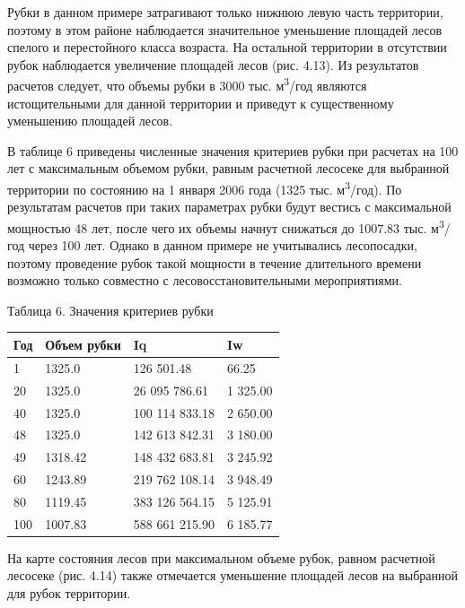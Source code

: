 \documentclass{article}
\begin{document}
Рубки в данном примере затрагивают только нижнюю 
левую часть территории, поэтому в этом районе 
наблюдается значительное уменьшение площадей 
лесов спелого и перестойного класса возраста. 
На остальной территории в отсутствии рубок 
наблюдается увеличение площадей лесов (рис. 
4.13). Из результатов расчетов следует, что объемы 
рубки в 3000 тыс. м\textsuperscript{3}/год являются истощительными 
для данной территории и приведут к существенному 
уменьшению площадей лесов.

В таблице 6 приведены численные значения критериев 
рубки при расчетах на 100 лет с максимальным 
объемом рубки, равным расчетной лесосеке для 
выбранной территории по состоянию на 1 января 
2006 года (1325 тыс. м\textsuperscript{3}/год). По результатам 
расчетов при таких параметрах рубки будут вестись 
с максимальной мощностью 48 лет, после чего их 
объемы начнут снижаться до 1007.83 тыс. м\textsuperscript{3}/год 
через 100 лет. Однако в данном примере не учитывались 
лесопосадки, поэтому проведение рубок такой 
мощности в течение длительного времени возможно 
только совместно с лесовосстановительными 
мероприятиями.

\begin{flushright}
Таблица 6. Значения критериев рубки

\begin{tabular}{|>{\raggedright}p{39pt}|>{\raggedright}p{98pt}|>{\raggedright}p{133pt}|>{\raggedright}p{133pt}|}
\hline
Год & Объем рубки & Iq & Iw\tabularnewline
\hline
1 & 1325.0 & 126 501.48 & 66.25\tabularnewline
\hline
20 & 1325.0 & 26 095 786.61 & 1 325.00\tabularnewline
\hline
40 & 1325.0 & 100 114 833.18 & 2 650.00\tabularnewline
\hline
48 & 1325.0 & 142 613 842.31 & 3 180.00\tabularnewline
\hline
49 & 1318.42 & 148 432 683.81 & 3 245.92\tabularnewline
\hline
60 & 1243.89 & 219 762 108.14 & 3 948.49\tabularnewline
\hline
80 & 1119.45 & 383 126 564.15 & 5 125.91\tabularnewline
\hline
100 & 1007.83 & 588 661 215.90 & 6 185.77\tabularnewline
\hline
\end{tabular}
\end{flushright}

На карте состояния лесов при максимальном объеме 
рубок, равном расчетной лесосеке (рис. 4.14) также 
отмечается уменьшение площадей лесов на выбранной 
для рубок территории.
\end{document}

